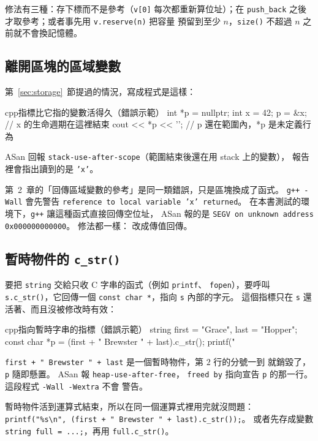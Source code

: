 修法有三種：存下標而不是參考（\texttt{v[0]} 每次都重新算位址）；在
\texttt{push\_back} 之後才取參考；或者事先用 \texttt{v.reserve(n)} 把容量
預留到至少 $n$，\texttt{size()} 不超過 $n$ 之前就不會換記憶體。

\subsection{離開區塊的區域變數}

第~\ref{sec:storage}~節提過的情況，寫成程式是這樣：

\begin{code}{cpp}{指標比它指的變數活得久（錯誤示範）}
int *p = nullptr;
{
    int x = 42;
    p = &x;
}                       // x 的生命週期在這裡結束
cout << *p << '\n';     // p 還在範圍內，*p 是未定義行為
\end{code}

ASan 回報 \texttt{stack-use-after-scope}（範圍結束後還在用 stack 上的變數），
報告裡會指出讀到的是 \texttt{'x'}。

第~2~章的「回傳區域變數的參考」是同一類錯誤，只是區塊換成了函式。
\texttt{g++ -Wall} 會先警告 \texttt{reference to local variable 'x'
returned}。 在本書測試的環境下，\texttt{g++} 讓這種函式直接回傳空位址，
ASan 報的是 \texttt{SEGV on unknown address 0x000000000000}。 修法都一樣：
改成傳值回傳。

\subsection{暫時物件的 \texttt{c\_str()}}

要把 \texttt{string} 交給只收 C 字串的函式（例如 \texttt{printf}、
\texttt{fopen}），要呼叫 \texttt{s.c\_str()}，它回傳一個
\texttt{const char *}，指向 \texttt{s} 內部的字元。 這個指標只在
\texttt{s} 還活著、而且沒被修改時有效：

\begin{code}{cpp}{指向暫時字串的指標（錯誤示範）}
string first = "Grace", last = "Hopper";
const char *p = (first + " Brewster " + last).c_str();
printf("%
\end{code}

\texttt{first + " Brewster " + last} 是一個暫時物件，第 $2$ 行的分號一到
就銷毀了，\texttt{p} 隨即懸置。 ASan 報 \texttt{heap-use-after-free}，
\texttt{freed by} 指向宣告 \texttt{p} 的那一行。 這段程式 \texttt{-Wall -Wextra} 不會
警告。

暫時物件活到運算式結束，所以在同一個運算式裡用完就沒問題：
\texttt{printf("\%s\textbackslash n", (first + " Brewster " +
last).c\_str());}。 或者先存成變數 \texttt{string full = ...;}，再用
\texttt{full.c\_str()}。

